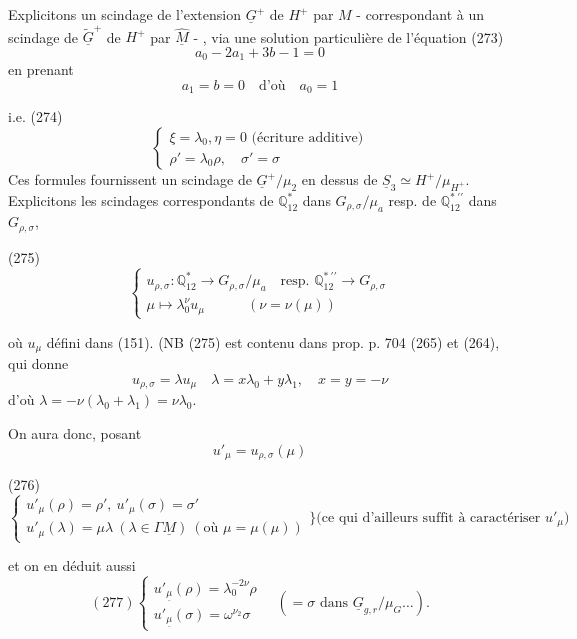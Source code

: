 Explicitons un scindage de l'extension
$\underline{G}^+$ de $H^+$ par $M$ - correspondant à un
scindage de $\underline{\tilde{G}}^+$ de $H^+$ par $\underline{\hat{M}}$ - , via
une solution particulière de l'équation
(273)
$$a_0 - 2a_1 + 3b - 1 = 0$$
en prenant
$$a_1 = b = 0 \quad \text{d'où} \quad a_0 = 1$$

i.e.
(274)
$$ \begin{cases} \xi = \lambda_0, \eta = 0 \text{ (écriture additive)} \\ \rho' = \lambda_0 \rho, \quad \sigma' = \sigma \end{cases} $$
Ces formules fournissent un scindage de $\underline{G}^+ / \mu_2$
en dessus de $\underline{S}_3 \simeq H^+ / \mu_{H^+}$. Explicitons
les scindages correspondants de $\mathbb{Q}_{12}^*$
dans $G_{\rho,\sigma} / \mu_a$ resp. de $\mathbb{Q}_{12}^{*\ \prime\prime}$ dans $G_{\rho,\sigma}$,

(275)
$$ \begin{cases} u_{\rho,\sigma} : \mathbb{Q}_{12}^* \to G_{\rho,\sigma} / \mu_a \quad \text{resp. } \mathbb{Q}_{12}^{*\ \prime\prime} \to G_{\rho,\sigma} \\ \mu \longmapsto \lambda_0^\nu u_\mu \quad \quad \quad (\nu = \nu(\mu)) \end{cases} $$

où $u_\mu$ défini dans (151). (NB (275) est contenu
dans prop. p. 704 (265) et (264), qui donne
$$u_{\rho,\sigma} = \lambda u_\mu \quad \lambda = x \lambda_0 + y \lambda_1, \quad x = y = -\nu$$
d'où $\lambda = -\nu(\lambda_0 + \lambda_1) = \nu \lambda_0$.

On aura donc, posant
$$u'_\mu = u_{\rho,\sigma}(\mu)$$

(276)
$$ \begin{cases} u'_\mu(\rho) = \rho', \ u'_\mu(\sigma) = \sigma' \\ u'_\mu(\lambda) = \mu \lambda \ (\lambda \in \Gamma \underline{M}) \ (\text{où } \mu = \mu(\mu)) \end{cases} \Bigg\} \text{(ce qui d'ailleurs suffit à caractériser } u'_\mu) $$

\newpage


et on en déduit aussi
$$ (277) \begin{cases} u'_{\underline{\mu}}(\rho) = \lambda_0^{-2\nu} \rho \\ u'_{\underline{\mu}}(\sigma) = \omega^{\nu_2} \sigma \end{cases} \quad (= \sigma \text{ dans } \underline{G}_{g,r}/\mu_G \dots). $$

